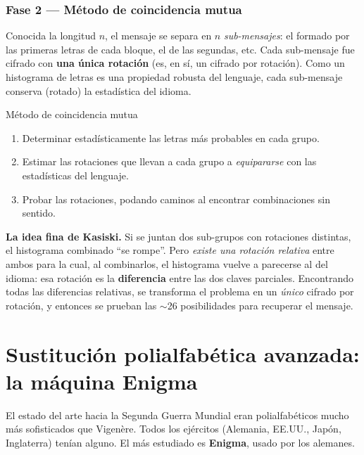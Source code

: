\documentclass[11pt,a4paper]{article}
\begin{document}
\subsubsection{Fase 2 — Método de coincidencia mutua}
Conocida la longitud $n$, el mensaje se separa en $n$ \emph{sub-mensajes}: el formado por las
primeras letras de cada bloque, el de las segundas, etc. Cada sub-mensaje fue cifrado con
\textbf{una única rotación} (es, en sí, un cifrado por rotación). Como un histograma de letras
es una propiedad robusta del lenguaje, cada sub-mensaje conserva (rotado) la estadística del
idioma.

\begin{defbox}{Método de coincidencia mutua}
\begin{enumerate}[leftmargin=1.6em,itemsep=1pt]
  \item Determinar estadísticamente las letras más probables en cada grupo.
  \item Estimar las rotaciones que llevan a cada grupo a \emph{equipararse} con las
        estadísticas del lenguaje.
  \item Probar las rotaciones, podando caminos al encontrar combinaciones sin sentido.
\end{enumerate}
\end{defbox}

\begin{notebox}
\textbf{La idea fina de Kasiski.} Si se juntan dos sub-grupos con rotaciones distintas, el
histograma combinado ``se rompe''. Pero \emph{existe una rotación relativa} entre ambos para
la cual, al combinarlos, el histograma vuelve a parecerse al del idioma: esa rotación es la
\textbf{diferencia} entre las dos claves parciales. Encontrando todas las diferencias
relativas, se transforma el problema en un \emph{único} cifrado por rotación, y entonces se
prueban las $\sim$26 posibilidades para recuperar el mensaje.
\end{notebox}

\section{Sustitución polialfabética avanzada: la máquina Enigma}

El estado del arte hacia la Segunda Guerra Mundial eran polialfabéticos mucho más
sofisticados que Vigenère. Todos los ejércitos (Alemania, EE.UU., Japón, Inglaterra) tenían
alguno. El más estudiado es \textbf{Enigma}, usado por los alemanes.
\end{document}
